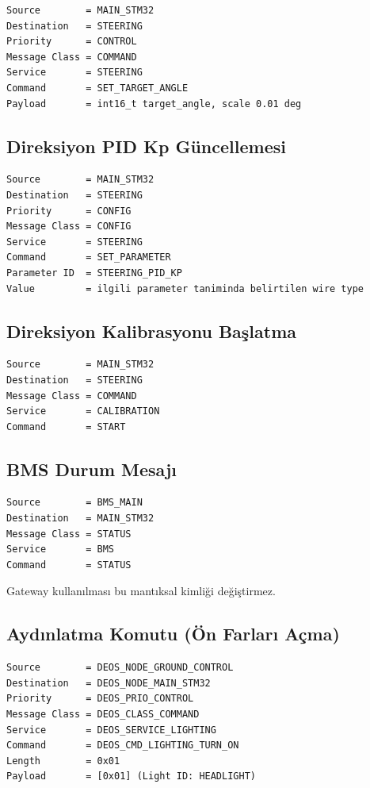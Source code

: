 \documentclass[a4paper,10pt]{article}
\begin{document}
\begin{verbatim}
Source        = MAIN_STM32
Destination   = STEERING
Priority      = CONTROL
Message Class = COMMAND
Service       = STEERING
Command       = SET_TARGET_ANGLE
Payload       = int16_t target_angle, scale 0.01 deg
\end{verbatim}

\subsection{Direksiyon PID Kp Güncellemesi}

\begin{verbatim}
Source        = MAIN_STM32
Destination   = STEERING
Priority      = CONFIG
Message Class = CONFIG
Service       = STEERING
Command       = SET_PARAMETER
Parameter ID  = STEERING_PID_KP
Value         = ilgili parameter taniminda belirtilen wire type
\end{verbatim}

\subsection{Direksiyon Kalibrasyonu Başlatma}

\begin{verbatim}
Source        = MAIN_STM32
Destination   = STEERING
Message Class = COMMAND
Service       = CALIBRATION
Command       = START
\end{verbatim}

\subsection{BMS Durum Mesajı}

\begin{verbatim}
Source        = BMS_MAIN
Destination   = MAIN_STM32
Message Class = STATUS
Service       = BMS
Command       = STATUS
\end{verbatim}

Gateway kullanılması bu mantıksal kimliği değiştirmez.

\subsection{Aydınlatma Komutu (Ön Farları Açma)}

\begin{verbatim}
Source        = DEOS_NODE_GROUND_CONTROL
Destination   = DEOS_NODE_MAIN_STM32
Priority      = DEOS_PRIO_CONTROL
Message Class = DEOS_CLASS_COMMAND
Service       = DEOS_SERVICE_LIGHTING
Command       = DEOS_CMD_LIGHTING_TURN_ON
Length        = 0x01
Payload       = [0x01] (Light ID: HEADLIGHT)
\end{verbatim}
\end{document}
